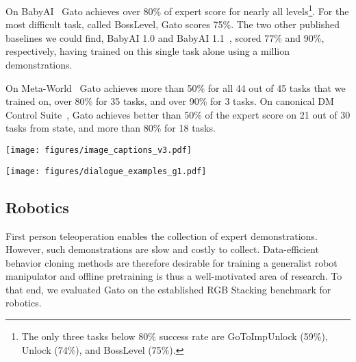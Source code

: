 \documentclass[10pt]{article} \usepackage[accepted]{tmlr}
\newcommand{\model}{{Gato}}
\begin{document}
On BabyAI~\citep{chevalier2018babyai} \model{} achieves over 80\% of expert score for nearly all levels\footnote{The only three tasks below 80\% success rate are GoToImpUnlock (59\%), Unlock (74\%), and BossLevel (75\%).}.
For the most difficult task, called BossLevel, \model{} scores 75\%.
The two other published baselines we could find, BabyAI 1.0 and BabyAI 1.1~\citep{hui2020babyai}, scored 77\% and 90\%, respectively, having trained on this single task alone using a million demonstrations.


On Meta-World~\citep{yu2020meta} \model{} achieves more than 50\% for all 44 out of 45 tasks that we trained on, over 80\% for 35 tasks, and over 90\% for 3 tasks.
On canonical DM Control Suite~\citep{tassa2018deepmind}, \model{} achieves better than 50\% of the expert score on 21 out of 30 tasks from state, and more than 80\% for 18 tasks.
\begin{figure*}[hbtp]
    \centering
    \texttt{[image: figures/image\_captions\_v3.pdf]}
    \caption{{\bf Image captions generated by \model{}.} \model{} prompted to be an image captioner, describing the first several held-out images from MS-COCO. We report the first three captions sampled using temperature 0.9, without cherry-picking. The prompt is shown in the appendix.
    \label{fig:vlm_caption_samples}}
\bigskip
\texttt{[image: figures/dialogue\_examples\_g1.pdf]}
    \caption{\textbf{Chitchat with \model{}.} Dialogues with \model{} when it is prompted to be a chat bot. Usually \model{} replies with a relevant response, but is often superficial or factually incorrect, which could likely be improved with further scaling. We used the same prompt as in~\citet{rae2021scaling}.
    \label{fig:chatbot_samples}}
\end{figure*}
\vskip 0.4cm
\subsection{Robotics}
\label{robotics_zeroshot}
\vskip 0.2cm
First person teleoperation enables the collection of expert demonstrations. However, such demonstrations are slow and costly to collect. 
Data-efficient behavior cloning methods are therefore desirable for training a generalist robot manipulator and offline pretraining is thus a well-motivated area of research.
To that end, we evaluated \model{} on the established RGB Stacking benchmark for robotics.
\vskip 0.4cm
\end{document}
